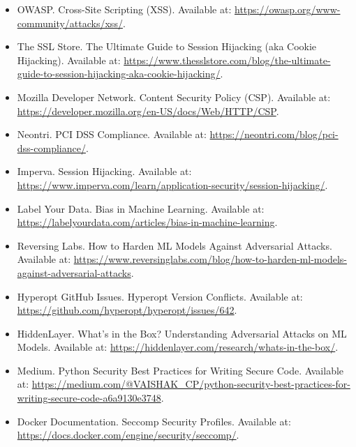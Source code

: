 \documentclass{article}
\begin{document}
\begin{itemize}
    \item OWASP. Cross-Site Scripting (XSS). Available at: \url{https://owasp.org/www-community/attacks/xss/}.
    \item The SSL Store. The Ultimate Guide to Session Hijacking (aka Cookie Hijacking). Available at: \url{https://www.thesslstore.com/blog/the-ultimate-guide-to-session-hijacking-aka-cookie-hijacking/}.
    \item Mozilla Developer Network. Content Security Policy (CSP). Available at: \url{https://developer.mozilla.org/en-US/docs/Web/HTTP/CSP}.
    \item Neontri. PCI DSS Compliance. Available at: \url{https://neontri.com/blog/pci-dss-compliance/}.
    \item Imperva. Session Hijacking. Available at: \url{https://www.imperva.com/learn/application-security/session-hijacking/}.
    \item Label Your Data. Bias in Machine Learning. Available at: \url{https://labelyourdata.com/articles/bias-in-machine-learning}.
    \item Reversing Labs. How to Harden ML Models Against Adversarial Attacks. Available at: \url{https://www.reversinglabs.com/blog/how-to-harden-ml-models-against-adversarial-attacks}.
    \item Hyperopt GitHub Issues. Hyperopt Version Conflicts. Available at: \url{https://github.com/hyperopt/hyperopt/issues/642}.
    \item HiddenLayer. What's in the Box? Understanding Adversarial Attacks on ML Models. Available at: \url{https://hiddenlayer.com/research/whats-in-the-box/}.
    \item Medium. Python Security Best Practices for Writing Secure Code. Available at: \url{https://medium.com/@VAISHAK_CP/python-security-best-practices-for-writing-secure-code-a6a9130e3748}.
    \item Docker Documentation. Seccomp Security Profiles. Available at: \url{https://docs.docker.com/engine/security/seccomp/}.
\end{itemize}
\sloppy
\end{document}
